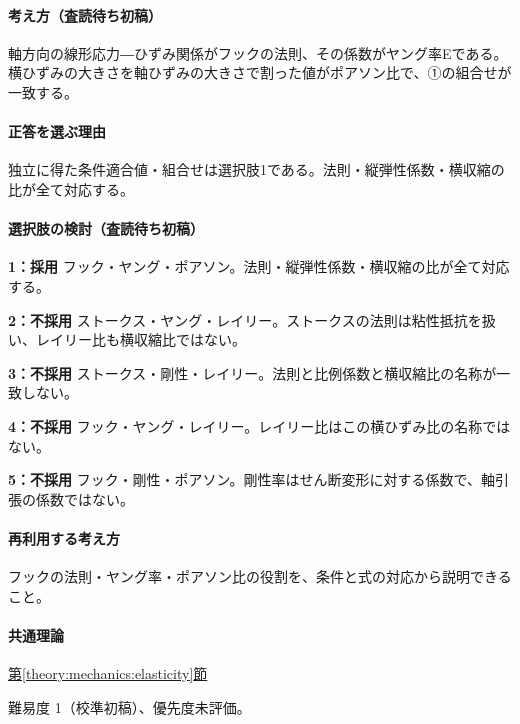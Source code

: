 \paragraph{考え方（査読待ち初稿）} 軸方向の線形応力―ひずみ関係がフックの法則、その係数がヤング率Eである。横ひずみの大きさを軸ひずみの大きさで割った値がポアソン比で、①の組合せが一致する。

\paragraph{正答を選ぶ理由} 独立に得た条件適合値・組合せは選択肢1である。法則・縦弾性係数・横収縮の比が全て対応する。

\paragraph{選択肢の検討（査読待ち初稿）}

\noindent\textbf{1：採用} フック・ヤング・ポアソン。法則・縦弾性係数・横収縮の比が全て対応する。\par

\noindent\textbf{2：不採用} ストークス・ヤング・レイリー。ストークスの法則は粘性抵抗を扱い、レイリー比も横収縮比ではない。\par

\noindent\textbf{3：不採用} ストークス・剛性・レイリー。法則と比例係数と横収縮比の名称が一致しない。\par

\noindent\textbf{4：不採用} フック・ヤング・レイリー。レイリー比はこの横ひずみ比の名称ではない。\par

\noindent\textbf{5：不採用} フック・剛性・ポアソン。剛性率はせん断変形に対する係数で、軸引張の係数ではない。\par

\paragraph{再利用する考え方} フックの法則・ヤング率・ポアソン比の役割を、条件と式の対応から説明できること。

\paragraph{共通理論} \hyperref[theory:mechanics:elasticity]{第\ref*{theory:mechanics:elasticity}節}

\par 難易度 1（校準初稿）、優先度未評価。

